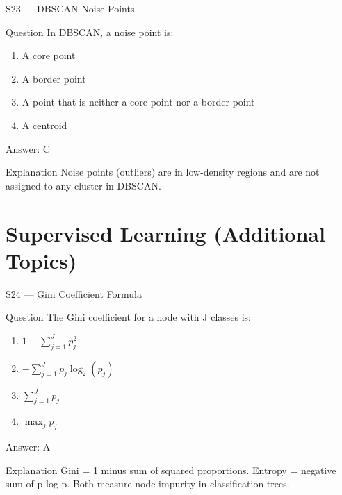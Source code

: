 \documentclass[aspectratio=169,8pt]{beamer}
\begin{document}
	\begin{frame}{S23 --- DBSCAN Noise Points}
		\begin{block}{Question}
			In DBSCAN, a noise point is:
			\begin{enumerate}
				\item A core point
				\item A border point
				\item A point that is neither a core point nor a border point
				\item A centroid
			\end{enumerate}
		\end{block}
		\begin{exampleblock}{Answer: C}\end{exampleblock}
		\begin{block}{Explanation}
			Noise points (outliers) are in low-density regions and are not assigned to any cluster in DBSCAN.
		\end{block}
	\end{frame}
	
	\section{Supervised Learning (Additional Topics)}
	
	\begin{frame}{S24 --- Gini Coefficient Formula}
		\begin{block}{Question}
			The Gini coefficient for a node with J classes is:
			\begin{enumerate}
				\item $1 - \sum_{j=1}^{J} p_j^2$
				\item $-\sum_{j=1}^{J} p_j \log_2(p_j)$
				\item $\sum_{j=1}^{J} p_j$
				\item $\max_j p_j$
			\end{enumerate}
		\end{block}
		\begin{exampleblock}{Answer: A}\end{exampleblock}
		\begin{block}{Explanation}
			Gini = 1 minus sum of squared proportions. Entropy = negative sum of p log p. Both measure node impurity in classification trees.
		\end{block}
	\end{frame}
	
\end{document}
